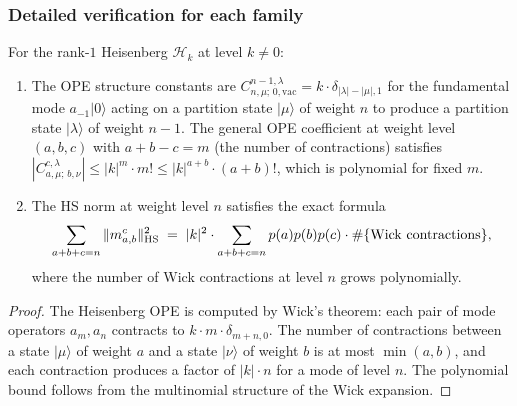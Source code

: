 \subsubsection{Detailed verification for each family}

\begin{proposition}
\label{prop:thqg-I-heisenberg-detail}
For the rank-$1$ Heisenberg $\mathcal{H}_k$ at level $k \neq 0$:
\begin{enumerate}[label=\textup{(\roman*)}]
\item The OPE structure constants are $C^{n-1,\lambda}_{n,\mu;\,0,\mathrm{vac}} = k \cdot \delta_{|\lambda|-|\mu|,1}$ for the fundamental mode $a_{-1}|0\rangle$ acting on a partition state $|\mu\rangle$ of weight $n$ to produce a partition state $|\lambda\rangle$ of weight $n-1$. The general OPE coefficient at weight level $(a,b,c)$ with $a+b-c = m$ (the number of contractions) satisfies $|C^{c,\lambda}_{a,\mu;\,b,\nu}| \leq |k|^m \cdot m! \leq |k|^{a+b} \cdot (a+b)!$, which is polynomial for fixed $m$.
\item The HS norm at weight level $n$ satisfies the exact formula
 \begin{equation}%
 \sum_{\substack{a+b+c = n}} \|m^c_{a,b}\|_{\HS}^2 \;=\; |k|^2 \cdot \sum_{\substack{a+b+c=n}} p(a)p(b)p(c) \cdot \#\{\text{Wick contractions}\},
 \end{equation}
 where the number of Wick contractions at level $n$ grows polynomially.
\end{enumerate}
\end{proposition}

\begin{proof}
The Heisenberg OPE is computed by Wick's theorem: each pair of mode operators $a_m, a_n$ contracts to $k \cdot m \cdot \delta_{m+n,0}$. The number of contractions between a state $|\mu\rangle$ of weight $a$ and a state $|\nu\rangle$ of weight $b$ is at most $\min(a,b)$, and each contraction produces a factor of $|k| \cdot n$ for a mode of level $n$. The polynomial bound follows from the multinomial structure of the Wick expansion.
\end{proof}


